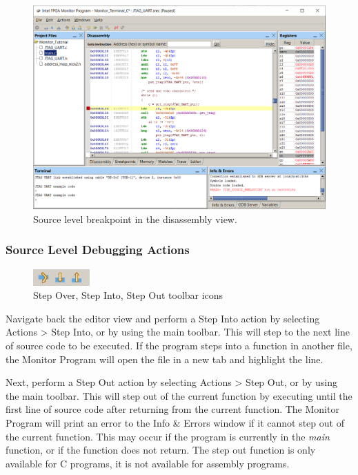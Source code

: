 \documentclass[11pt, twoside, pdftex]{article}
\begin{document}
\begin{figure}[h]
   \begin{center}
      \includegraphics[scale=0.5]{screenshots/figure28.png}
   \end{center}
   \caption{Source level breakpoint in the disassembly view.}
	 \label{fig:28}
\end{figure}

\subsubsection{Source Level Debugging Actions}

\begin{figure}[h]
   \begin{center}
      \includegraphics[scale=1]{screenshots/figure29.png}
   \end{center}
   \caption{Step Over, Step Into, Step Out toolbar icons}
	 \label{fig:29}
\end{figure}

Navigate back the editor view and perform a Step Into action by selecting {\sf Actions > Step Into}, or by using the main toolbar.
This will step to the next line of source code to be executed. If the program steps into a function in another file, the Monitor
Program will open the file in a new tab and highlight the line.

Next, perform a Step Out action by selecting {\sf Actions > Step Out}, or by using the main toolbar. This will step out of the current function 
by executing until the first line of source code after returning from the current function. The Monitor Program will print an error to the
{\sf Info \& Errors} window if it cannot step out of the current function. This may occur if the program is currently in the
{\it main} function, or if the function does not return. 
The step out function is only available for C programs, it is not available for assembly programs.
\end{document}
